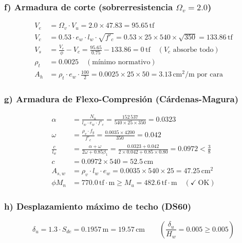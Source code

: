 \subsubsection*{f) Armadura de corte (sobrerresistencia $\Omega_v=2.0$)}
\begin{align*}
V_e   &= \Omega_v\cdot V_u = 2.0\times47.83=95.65\,\text{tf}\\
V_c   &= 0.53\cdot e_w\cdot l_w\cdot\sqrt{f'_c}
       = 0.53\times25\times540\times\sqrt{350}=133.86\,\text{tf}\\
V_s   &= \frac{V_e}{\phi}-V_c
       = \frac{95.65}{0.75}-133.86=0\,\text{tf}
       \quad(V_c\text{ absorbe todo})\\
\rho_t &= 0.0025\quad(\text{mínimo normativo})\\
A_h   &= \rho_t\cdot e_w\cdot\frac{100}{2}
       = 0.0025\times25\times50 = 3.13\,\text{cm}^2/\text{m por cara}
\end{align*}

\subsubsection*{g) Armadura de Flexo-Compresión (Cárdenas-Magura)}
\begin{align*}
\alpha &= \frac{N_u}{l_w\cdot e_w\cdot f'_c}
        = \frac{152\,537}{540\times25\times350}=0.0323\\
\omega &= \frac{\rho_v\cdot f_y}{f'_c}
        = \frac{0.0035\times4200}{350}=0.042\\
\frac{c}{l_w} &= \frac{\alpha+\omega}{2\omega+0.85\beta_1}
               = \frac{0.0323+0.042}{2\times0.042+0.85\times0.80}
               = 0.0972 < \tfrac{3}{8}\\
c       &= 0.0972\times540=52.5\,\text{cm}\\
A_{s,w} &= \rho_v\cdot l_w\cdot e_w=0.0035\times540\times25=47.25\,\text{cm}^2\\
\phi M_n &= 770.0\,\text{tf}\cdot\text{m}
           \geq M_u=482.6\,\text{tf}\cdot\text{m} \quad(\checkmark~\text{OK})
\end{align*}

\subsubsection*{h) Desplazamiento máximo de techo (DS60)}
\begin{equation*}
\delta_u = 1.3\cdot S_{de} = 0.1957\,\text{m}=19.57\,\text{cm}
\qquad \left(\frac{\delta_u}{H_w}=0.005\geq0.005\right)
\end{equation*}

